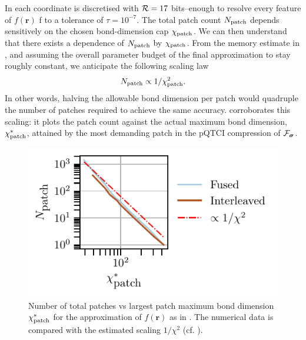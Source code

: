 In  each coordinate is discretised with $\mathcal{R} = 17$ bits--enough to resolve every feature of $f(\boldsymbol{r})$
f to a tolerance of $\tau=10^{-7}$.
The total patch count $N_{\text{patch}}$ depends sensitively on the chosen bond-dimension cap $\chi_{\text{patch}}$.
We can then understand that there exists a dependence of $N_{\text{patch}}$ by $\chi_{\text{patch}}$. From the memory estimate in , and assuming the overall parameter budget of the final approximation to stay roughly constant, we anticipate the following scaling law
\begin{equation}
	N_{\text{patch}} \propto 1 / \chi_{\text{patch}}^2. 
	\label{eq:scalingNpatchBonddim}
\end{equation}
In other words, halving the allowable bond dimension per patch would quadruple the number of patches required to achieve the same accuracy.
 corroborates this scaling: it plots the patch count against the actual maximum bond dimension, $\chi_{\text{patch}}^*$\footnotemark, attained by the most demanding patch in the pQTCI compression of $\mathcal{F}_{\boldsymbol{\sigma}}$.
\begin{figure}[htbp]
	\centering
	\includegraphics{figures/localFunc_Npatch_vs_Chipatch.pdf}
	\caption{Number of total patches vs largest patch maximum bond dimension $\chi_{\text{patch}}^*$ for the approximation of $f(\boldsymbol{r})$ as in . The numerical data is compared with the estimated scaling $1/\chi^2$ (cf. ).}
	\label{fig:NpatchvsChipatch}
\end{figure}

